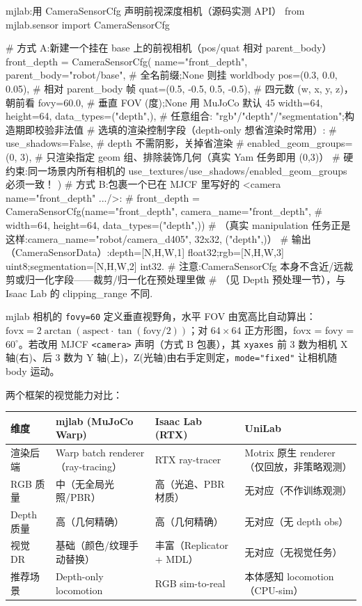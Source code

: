 \begin{codebox}[Python]{mjlab:用 CameraSensorCfg 声明前视深度相机（源码实测 API）}
from mjlab.sensor import CameraSensorCfg

# 方式 A:新建一个挂在 base 上的前视相机（pos/quat 相对 parent_body）
front_depth = CameraSensorCfg(
    name="front_depth",
    parent_body="robot/base",      # 全名前缀;None 则挂 worldbody
    pos=(0.3, 0.0, 0.05),          # 相对 parent_body 帧
    quat=(0.5, -0.5, 0.5, -0.5),   # 四元数 (w, x, y, z)，朝前看
    fovy=60.0,                      # 垂直 FOV (度);None 用 MuJoCo 默认 45
    width=64, height=64,
    data_types=("depth",),         # 任意组合: "rgb"/"depth"/"segmentation";构造期即校验非法值
    # 选填的渲染控制字段（depth-only 想省渲染时常用）:
    # use_shadows=False,           # depth 不需阴影，关掉省渲染
    # enabled_geom_groups=(0, 3),  # 只渲染指定 geom 组、排除装饰几何（真实 Yam 任务即用 (0,3)）
    # 硬约束:同一场景内所有相机的 use_textures/use_shadows/enabled_geom_groups 必须一致！
)
# 方式 B:包裹一个已在 MJCF 里写好的 <camera name="front_depth" .../>:
#   front_depth = CameraSensorCfg(name="front_depth", camera_name="front_depth",
#                                 width=64, height=64, data_types=("depth",))
#   （真实 manipulation 任务正是这样:camera_name="robot/camera_d405", 32x32, ("depth",)）
# 输出（CameraSensorData）:depth=[N,H,W,1] float32;rgb=[N,H,W,3] uint8;segmentation=[N,H,W,2] int32.
# 注意:CameraSensorCfg 本身不含近/远裁剪或归一化字段——裁剪/归一化在预处理里做
#       （见 Depth 预处理一节），与 Isaac Lab 的 clipping_range 不同.
\end{codebox}

mjlab 相机的 \verb|fovy=60| 定义垂直视野角，水平 FOV 由宽高比自动算出：$\text{fovx}=2\arctan(\text{aspect}\cdot\tan(\text{fovy}/2))$；对 $64\times64$ 正方形图，fovx = fovy = $60^\circ$。若改用 MJCF \verb|<camera>| 声明（方式 B 包裹），其 \verb|xyaxes| 前 3 数为相机 X 轴(右)、后 3 数为 Y 轴(上)，Z(光轴)由右手定则定，\verb|mode="fixed"| 让相机随 body 运动。

两个框架的视觉能力对比：

\begin{center}
\small
\begin{tabular}{@{}llll@{}}
\toprule
维度 & mjlab (MuJoCo Warp) & Isaac Lab (RTX) & UniLab \\
\midrule
渲染后端 & Warp batch renderer（ray-tracing） & RTX ray-tracer & Motrix 原生 renderer（仅回放，非策略观测） \\
RGB 质量 & 中（无全局光照/PBR） & 高（光追、PBR 材质） & 无对应（不作训练观测） \\
Depth 质量 & 高（几何精确） & 高（几何精确） & 无对应（无 depth obs） \\
视觉 DR & 基础（颜色/纹理手动替换） & 丰富（Replicator + MDL） & 无对应（无视觉任务） \\
推荐场景 & Depth-only locomotion & RGB sim-to-real & 本体感知 locomotion（CPU-sim） \\
\bottomrule
\end{tabular}
\end{center}


